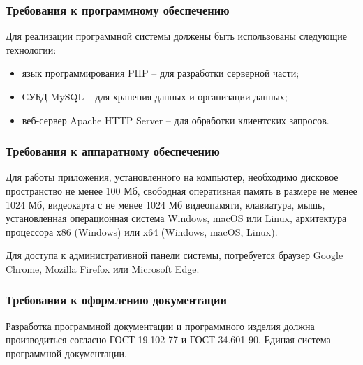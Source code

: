 \subsubsection{Требования к программному обеспечению}
Для реализации программной системы должены быть использованы следующие технологии:
\begin{itemize}
	\item язык программирования PHP -- для разработки серверной части;
	\item СУБД MySQL -- для хранения данных и организации данных;
	\item веб-сервер Apache HTTP Server -- для обработки клиентских запросов.
\end{itemize}

\subsubsection{Требования к аппаратному обеспечению}
Для работы приложения, установленного на компьютер, необходимо дисковое пространство не менее 100 Мб, свободная оперативная память в размере не менее 1024 Мб, видеокарта с не менее 1024 Мб видеопамяти, клавиатура, мышь, установленная операционная система Windows, macOS или Linux, архитектура процессора х86 (Windows) или x64 (Windows, macOS, Linux). 

Для доступа к административной панели системы, потребуется браузер Google Chrome, Mozilla Firefox или Microsoft Edge.
\subsubsection{Требования к оформлению документации}
Разработка программной документации и программного изделия должна производиться согласно ГОСТ 19.102-77 и ГОСТ 34.601-90. Единая система программной документации.